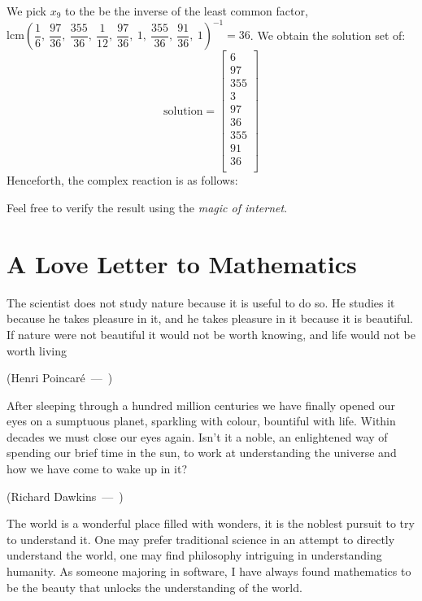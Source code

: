 \documentclass{article}
\let\oldquote\quote
\let\endoldquote\endquote
\renewenvironment{quote}[2][]
{\if\relax\detokenize{#1}\relax
	\def\quoteauthor{#2}%
	\else
	\def\quoteauthor{#2~---~#1}%
	\fi
	\oldquote}
{\par\nobreak\smallskip\hfill(\quoteauthor)%
	\endoldquote\addvspace{\bigskipamount}}
\begin{document}
	We pick $x_9$ to the be the inverse of the least common factor, $\mathrm{lcm}\left(\dfrac{1}{6},\: \dfrac{97}{36},\: \dfrac{355}{36},\: \dfrac{1}{12},\: \dfrac{97}{36},\: 1,\: \dfrac{355}{36},\: \dfrac{91}{36},\: 1\right)^{-1} = 36$. We obtain the solution set of:
	\begin{equation*}
	\mathrm{solution} = 
	\begin{bmatrix}
	6 \\
	97 \\
	355 \\
	3 \\
	97 \\
	36 \\
	355 \\
	91 \\
	36 \\
	\end{bmatrix}
	\end{equation*}
	Henceforth, the complex reaction is as follows:
	\begin{center}
	\end{center}
	Feel free to verify the result using the \emph{magic of internet}.
	
	\section{A Love Letter to Mathematics}
	\begin{quote}{Henri Poincaré}
		The scientist does not study nature because it is useful to do so. He studies it because he takes pleasure in it, and he takes pleasure in it because it is beautiful. If nature were not beautiful it would not be worth knowing, and life would not be worth living
	\end{quote}
	
	\begin{quote}{Richard Dawkins}
		After sleeping through a hundred million centuries we have finally opened our eyes on a sumptuous planet, sparkling with colour, bountiful with life. Within decades we must close our eyes again. Isn’t it a noble, an enlightened way of spending our brief time in the sun, to work at understanding the universe and how we have come to wake up in it?
	\end{quote}
	
	The world is a wonderful place filled with wonders, it is the noblest pursuit to try to understand it. One may prefer traditional science in an attempt to directly understand the world, one may find philosophy intriguing in understanding humanity. As someone majoring in software, I have always found mathematics to be the beauty that unlocks the understanding of the world. 
	
\end{document}
